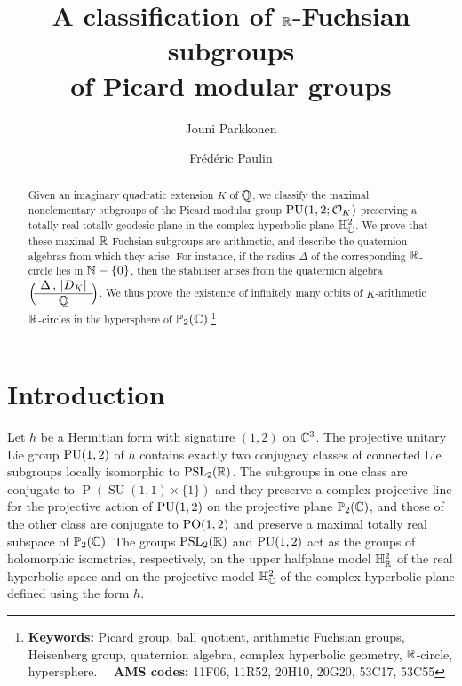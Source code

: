 \documentclass[11pt]{article}
\title{A classification of ${\mathbb R}$-Fuchsian subgroups \\
of Picard modular groups}
\author{Jouni Parkkonen \and Fr\'ed\'eric Paulin}
\begin{document}



\maketitle
\begin{abstract} 
    Given an imaginary quadratic extension $K$ of ${\mathbb Q}$, we classify
    the maximal nonelementary subgroups of the Picard modular group
    $\operatorname{PU}(1,2;{\cal O}_K)$ preserving a totally real totally geodesic
    plane in the complex hyperbolic plane ${\mathbb H}^2_{\mathbb C}$. We prove that
    these maximal ${\mathbb R}$-Fuchsian subgroups are arithmetic, and
    describe the quaternion algebras from which they arise. For
    instance, if the radius $\Delta$ of the corresponding ${\mathbb R}$-circle
    lies in ${\mathbb N}-\{0\}$, then the stabiliser arises from the
    quaternion algebra $\Big(\!\begin{array}{c} \Delta\,,\, |D_K|
    \\\hline{\mathbb Q}\end{array} \!\Big)$.  We thus prove the existence of
    infinitely many orbits of $K$-arithmetic ${\mathbb R}$-circles in the
    hypersphere of ${\mathbb P}_2({\mathbb C})$.\footnote{{\bf Keywords:} Picard group, ball quotient, arithmetic
    Fuchsian groups, Heisenberg group, quaternion algebra, complex
    hyperbolic geometry, ${\mathbb R}$-circle, hypersphere.~~ {\bf AMS codes:
    } 11F06, 11R52, 20H10, 20G20, 53C17, 53C55}
\end{abstract}


\section{Introduction}
\label{sec:intro}
Let $h$ be a Hermitian form with signature $(1,2)$ on ${\mathbb C}^3$. The
projective unitary Lie group $\operatorname{PU}(1,2)$ of $h$ contains exactly two
conjugacy classes of connected Lie subgroups locally isomorphic to
$\operatorname{PSL}_{2}({\mathbb R})$. The subgroups in one class are conjugate to
$\operatorname{P}(\operatorname{SU}(1,1)\times\{1\})$ and they
preserve a complex projective line for the projective action of
$\operatorname{PU}(1,2)$ on the projective plane ${\mathbb P}_2({\mathbb C})$, and those of the
other class are conjugate to $\operatorname{PO}(1,2)$ and preserve a maximal totally
real subspace of ${\mathbb P}_2({\mathbb C})$.  The groups $\operatorname{PSL}_{2}({\mathbb R})$ and $\operatorname{PU}(1,2)$ act
as the groups of holomorphic isometries, respectively, on the upper
halfplane model ${{\mathbb H}}^2_{\mathbb R}$ of the real hyperbolic space and on the
projective model ${{\mathbb H}}^2_{\mathbb C}$ of the complex hyperbolic plane defined using
the form $h$.
\end{document}
